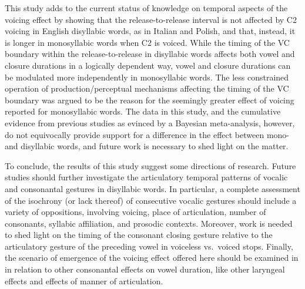 \documentclass[12pt,a4paper,]{article}
\begin{document}
This study adds to the current status of knowledge on temporal aspects
of the voicing effect by showing that the release-to-release interval is
not affected by C2 voicing in English disyllabic words, as in Italian
and Polish, and that, instead, it is longer in monosyllabic words when
C2 is voiced. While the timing of the VC boundary within the
release-to-release in disyllabic words affects both vowel and closure
durations in a logically dependent way, vowel and closure durations can
be modulated more independently in monosyllabic words. The less
constrained operation of production/perceptual mechanisms affecting the
timing of the VC boundary was argued to be the reason for the seemingly
greater effect of voicing reported for monosyllabic words. The data in
this study, and the cumulative evidence from previous studies as evinced
by a Bayesian meta-analysis, however, do not equivocally provide support
for a difference in the effect between mono- and disyllabic words, and
future work is necessary to shed light on the matter.

To conclude, the results of this study suggest some directions of
research. Future studies should further investigate the articulatory
temporal patterns of vocalic and consonantal gestures in disyllabic
words. In particular, a complete assessment of the isochrony (or lack
thereof) of consecutive vocalic gestures should include a variety of
oppositions, involving voicing, place of articulation, number of
consonants, syllabic affiliation, and prosodic contexts. Moreover, work
is needed to shed light on the timing of the consonant closing gesture
relative to the articulatory gesture of the preceding vowel in voiceless
vs.~voiced stops. Finally, the scenario of emergence of the voicing
effect offered here should be examined in in relation to other
consonantal effects on vowel duration, like other laryngeal effects and
effects of manner of articulation.


\end{document}
